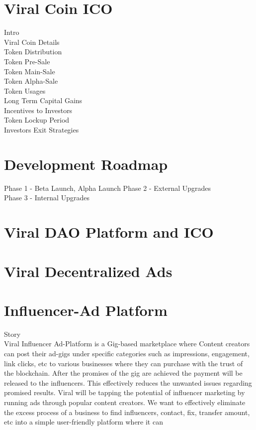 \documentclass[10pt]{article}
\begin{document}
\section{Viral Coin ICO}
Intro\\
Viral Coin Details\\
Token Distribution\\
Token Pre-Sale\\
Token Main-Sale\\
Token Alpha-Sale\\
Token Usages\\
Long Term Capital Gains\\
Incentives to Investors\\
Token Lockup Period\\
Investors Exit Strategies\\

\section{Development Roadmap}

Phase 1 - Beta Launch, Alpha Launch
Phase 2 - External Upgrades\\
Phase 3 - Internal Upgrades\\

\section{Viral DAO Platform and ICO}

\section{Viral Decentralized Ads}

\section{Influencer-Ad Platform}

Story\\

Viral Influencer Ad-Platform is a Gig-based marketplace where Content creators can post their ad-gigs under specific categories such as impressions, engagement, link clicks, etc to various businesses where they can purchase with the trust of the blockchain. After the promises of the gig are achieved the payment will be released to the influencers. This effectively reduces the unwanted issues regarding promised results. Viral will be tapping the potential of influencer marketing by running ads through popular content creators. We want to effectively eliminate the excess process of a business to find influencers, contact, fix, transfer amount, etc into a simple user-friendly platform where it can\\
\end{document}
